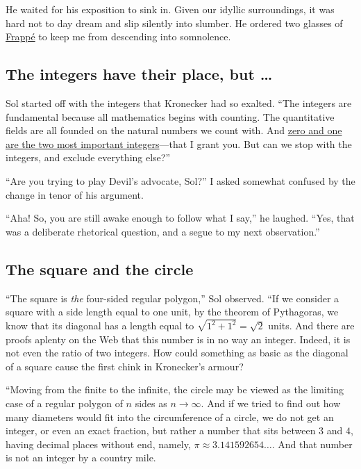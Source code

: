 \documentclass[
  a4paper,
]{article}
\begin{document}
He waited for his exposition to sink in. Given our idyllic surroundings,
it was hard not to day dream and slip silently into slumber. He ordered
two glasses of
\href{https://en.wikipedia.org/wiki/Frapp\%C3\%A9_coffee}{Frappé} to
keep me from descending into somnolence.

\subsection{The integers have their place, but
\ldots{}}\label{the-integers-have-their-place-but}

Sol started off with the integers that Kronecker had so exalted. ``The
integers are fundamental because all mathematics begins with counting.
The quantitative fields are all founded on the natural numbers we count
with. And
\href{https://swanlotus.netlify.app/blogs/the-two-most-important-numbers-zero-and-one}{zero
and one are the two most important integers}---that I grant you. But can
we stop with the integers, and exclude everything else?''

``Are you trying to play Devil's advocate, Sol?'' I asked somewhat
confused by the change in tenor of his argument.

``Aha! So, you are still awake enough to follow what I say,'' he
laughed. ``Yes, that was a deliberate rhetorical question, and a segue
to my next observation.''

\subsection{The square and the circle}\label{the-square-and-the-circle}

``The square is \emph{the} four-sided regular polygon,'' Sol observed.
``If we consider a square with a side length equal to one unit, by the
theorem of Pythagoras, we know that its diagonal has a length equal to
\(\sqrt{1^2 + 1^2} = \sqrt{2}\) units. And there are proofs aplenty on
the Web that this number is in no way an integer. Indeed, it is not even
the ratio of two integers. How could something as basic as the diagonal
of a square cause the first chink in Kronecker's armour?

``Moving from the finite to the infinite, the circle may be viewed as
the limiting case of a regular polygon of \(n\) sides as
\(n \to \infty\). And if we tried to find out how many diameters would
fit into the circumference of a circle, we do not get an integer, or
even an exact fraction, but rather a number that sits between \(3\) and
\(4\), having decimal places without end, namely,
\(\pi \approx 3.141592654\dots\). And that number is not an integer by a
country mile.
\end{document}
